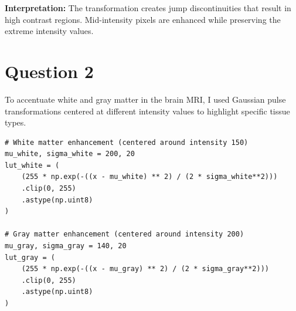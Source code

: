 \documentclass[10pt,a4paper]{article}
\begin{document}
\textbf{Interpretation:} The transformation creates jump discontinuities that result in high contrast regions. Mid-intensity pixels are enhanced while preserving the extreme intensity values.

\section{Question 2}
To accentuate white and gray matter in the brain MRI, I used Gaussian pulse transformations centered at different intensity values to highlight specific tissue types.

\begin{lstlisting}[caption=Brain tissue enhancement]
# White matter enhancement (centered around intensity 150)
mu_white, sigma_white = 200, 20
lut_white = (
    (255 * np.exp(-((x - mu_white) ** 2) / (2 * sigma_white**2)))
    .clip(0, 255)
    .astype(np.uint8)
)

# Gray matter enhancement (centered around intensity 200)
mu_gray, sigma_gray = 140, 20
lut_gray = (
    (255 * np.exp(-((x - mu_gray) ** 2) / (2 * sigma_gray**2)))
    .clip(0, 255)
    .astype(np.uint8)
)
\end{lstlisting}
\end{document}

